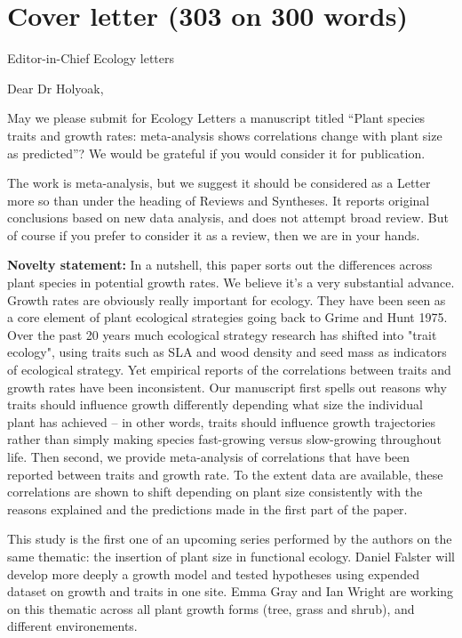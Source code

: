 \documentclass[a4paper]{article}\usepackage[]{graphicx}\usepackage[]{color}
\begin{document}
\section*{Cover letter (303 on 300 words)}\label{Proposal}

Editor-in-Chief Ecology letters


Dear Dr Holyoak,




May we please submit for Ecology Letters a manuscript titled “Plant species traits and growth rates: meta-analysis shows correlations change with plant size as predicted”? We would be grateful if you would consider it for publication.

The work is meta-analysis, but we suggest it should be considered as a Letter more so than under the heading of Reviews and Syntheses. It reports original conclusions based on new data analysis, and does not attempt broad review. But of course if you prefer to consider it as a review, then we are in your hands.


\textbf{Novelty statement:}
In a nutshell, this paper sorts out the differences across plant species in potential growth rates. We believe it's a very substantial advance. Growth rates are obviously really important for ecology. They have been seen as a core element of plant ecological strategies going back to Grime and Hunt 1975. Over the past 20 years much ecological strategy research has shifted into "trait ecology", using traits such as SLA and wood density and seed mass as indicators of ecological strategy. Yet empirical reports of the correlations between traits and growth rates have been inconsistent. Our manuscript first spells out reasons why traits should influence growth differently depending what size the individual plant has achieved -- in other words, traits should influence growth trajectories rather than simply making species fast-growing versus slow-growing throughout life. Then second, we provide meta-analysis of correlations that have been reported between traits and growth rate. To the extent data are available, these correlations are shown to shift depending on plant size consistently with the reasons explained and the predictions made in the first part of the paper.

This study is the first one of an upcoming series performed by the authors on the same thematic: the insertion of plant size in functional ecology. Daniel Falster will develop more deeply a growth model and tested hypotheses using expended dataset on growth and traits in one site. Emma Gray and Ian Wright are working on this thematic across all plant growth forms (tree, grass and shrub), and different environements.    
\end{document}
